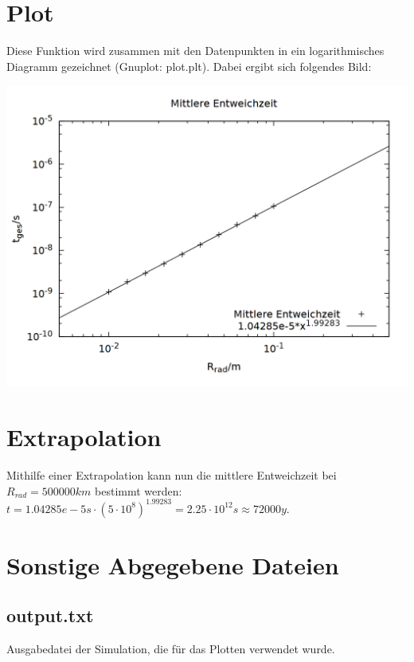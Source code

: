 \documentclass{scrartcl}
\begin{document}
\section{Plot}
Diese Funktion wird zusammen mit den Datenpunkten in ein logarithmisches Diagramm gezeichnet (Gnuplot: plot.plt). Dabei ergibt sich folgendes Bild:\\

\begin{center}
\includegraphics[scale=0.3]{plot.png}
\end{center}   

\section{Extrapolation}
Mithilfe einer Extrapolation kann nun die mittlere Entweichzeit bei $R_{rad} = 500000km$ bestimmt werden: $t = 1.04285e-5s\cdot (5\cdot 10^8)^{1.99283} = 2.25\cdot 10^{12} s \approx 72000y$. 

\section{Sonstige Abgegebene Dateien}
\subsection{output.txt}
Ausgabedatei der Simulation, die für das Plotten verwendet wurde.
\end{document}
